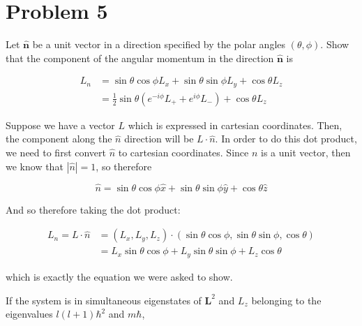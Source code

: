 \documentclass[10pt]{article}
\begin{document}
    \pagebreak 

    \section*{Problem 5}
    Let $\hat{\mathbf n}$ be a unit vector in a direction specified by the polar angles $(\theta,\phi)$. Show that the component of the angular momentum in the direction $\hat{\mathbf n}$ is 

    \begin{align*}
        L_n &= \sin \theta \cos \phi L_x + \sin \theta \sin \phi L_y+ \cos \theta L_z\\
        &= \frac 12 \sin \theta (e^{-i\phi} L_+ + e^{i \phi} L_-) + \cos \theta L_z 
    \end{align*}

    \begin{solution}
        Suppose we have a vector $L$ which is expressed in cartesian coordinates. Then, the component along the $\hat n$ direction will be $L \cdot \hat n$. In order to do this dot product, we need to first convert $\hat n$ to cartesian coordinates. Since $n$ is a unit vector, then we know that $|\hat n | = 1$, so therefore 

        \[ \hat n = \sin \theta \cos \phi \hat x + \sin \theta \sin \phi \hat y+ \cos \theta\hat z\]

        And so therefore taking the dot product: 

        \begin{align*}
            L_n = L \cdot \hat n &= (L_x, L_y, L_z) \cdot (\sin \theta \cos \phi, \sin \theta \sin \phi, \cos \theta)\\
            &= L_x \sin \theta \cos \phi + L_y \sin \theta \sin \phi + L_z \cos \theta
        \end{align*}

        which is exactly the equation we were asked to show.


        
    \end{solution}

    If the system is in simultaneous eigenstates of $\mathbf{L}^2$ and $L_z$ belonging to the eigenvalues $l(l+1)\hbar^2$ and $m\hbar$, 
\end{document}
